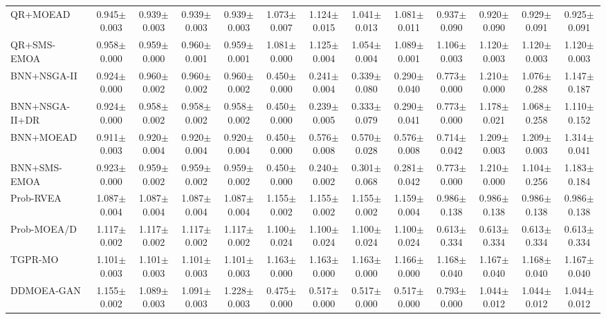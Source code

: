 \begin{table}[htbp]
{\begin{tabular}{l c c c c c c c c c c c c}
QR+MOEAD & 0.945$\pm$0.003 & 0.939$\pm$0.003 & 0.939$\pm$0.003 & 0.939$\pm$0.003 & 1.073$\pm$0.007 & 1.124$\pm$0.015 & 1.041$\pm$0.013 & 1.081$\pm$0.011 & 0.937$\pm$0.090 & 0.920$\pm$0.090 & 0.929$\pm$0.091 & 0.925$\pm$0.091 \\
QR+SMS-EMOA & 0.958$\pm$0.000 & 0.959$\pm$0.000 & 0.960$\pm$0.001 & 0.959$\pm$0.001 & 1.081$\pm$0.000 & 1.125$\pm$0.004 & 1.054$\pm$0.004 & 1.089$\pm$0.001 & 1.106$\pm$0.003 & 1.120$\pm$0.003 & 1.120$\pm$0.003 & 1.120$\pm$0.003 \\
BNN+NSGA-II & 0.924$\pm$0.000 & 0.960$\pm$0.002 & 0.960$\pm$0.002 & 0.960$\pm$0.002 & 0.450$\pm$0.000 & 0.241$\pm$0.004 & 0.339$\pm$0.080 & 0.290$\pm$0.040 & 0.773$\pm$0.000 & 1.210$\pm$0.000 & 1.076$\pm$0.288 & 1.147$\pm$0.187 \\
BNN+NSGA-II+DR & 0.924$\pm$0.000 & 0.958$\pm$0.002 & 0.958$\pm$0.002 & 0.958$\pm$0.002 & 0.450$\pm$0.000 & 0.239$\pm$0.005 & 0.333$\pm$0.079 & 0.290$\pm$0.041 & 0.773$\pm$0.000 & 1.178$\pm$0.021 & 1.068$\pm$0.258 & 1.110$\pm$0.152 \\
BNN+MOEAD & 0.911$\pm$0.003 & 0.920$\pm$0.004 & 0.920$\pm$0.004 & 0.920$\pm$0.004 & 0.450$\pm$0.000 & 0.576$\pm$0.008 & 0.570$\pm$0.028 & 0.576$\pm$0.008 & 0.714$\pm$0.042 & 1.209$\pm$0.003 & 1.209$\pm$0.003 & 1.314$\pm$0.041 \\
BNN+SMS-EMOA & 0.923$\pm$0.000 & 0.959$\pm$0.002 & 0.959$\pm$0.002 & 0.959$\pm$0.002 & 0.450$\pm$0.000 & 0.240$\pm$0.002 & 0.301$\pm$0.068 & 0.281$\pm$0.042 & 0.773$\pm$0.000 & 1.210$\pm$0.000 & 1.104$\pm$0.256 & 1.183$\pm$0.184 \\
Prob-RVEA & 1.087$\pm$0.004 & 1.087$\pm$0.004 & 1.087$\pm$0.004 & 1.087$\pm$0.004 & 1.155$\pm$0.002 & 1.155$\pm$0.002 & 1.155$\pm$0.002 & 1.159$\pm$0.004 & 0.986$\pm$0.138 & 0.986$\pm$0.138 & 0.986$\pm$0.138 & 0.986$\pm$0.138 \\
Prob-MOEA/D & 1.117$\pm$0.002 & 1.117$\pm$0.002 & 1.117$\pm$0.002 & 1.117$\pm$0.002 & 1.100$\pm$0.024 & 1.100$\pm$0.024 & 1.100$\pm$0.024 & 1.100$\pm$0.024 & 0.613$\pm$0.334 & 0.613$\pm$0.334 & 0.613$\pm$0.334 & 0.613$\pm$0.334 \\
TGPR-MO & 1.101$\pm$0.003 & 1.101$\pm$0.003 & 1.101$\pm$0.003 & 1.101$\pm$0.003 & 1.163$\pm$0.000 & 1.163$\pm$0.000 & 1.163$\pm$0.000 & 1.166$\pm$0.000 & 1.168$\pm$0.040 & 1.167$\pm$0.040 & 1.168$\pm$0.040 & 1.167$\pm$0.040 \\
DDMOEA-GAN & 1.155$\pm$0.002 & 1.089$\pm$0.003 & 1.091$\pm$0.003 & 1.228$\pm$0.003 & 0.475$\pm$0.000 & 0.517$\pm$0.000 & 0.517$\pm$0.000 & 0.517$\pm$0.000 & 0.793$\pm$0.000 & 1.044$\pm$0.012 & 1.044$\pm$0.012 & 1.044$\pm$0.012 \\

\end{tabular}}
\end{table}
